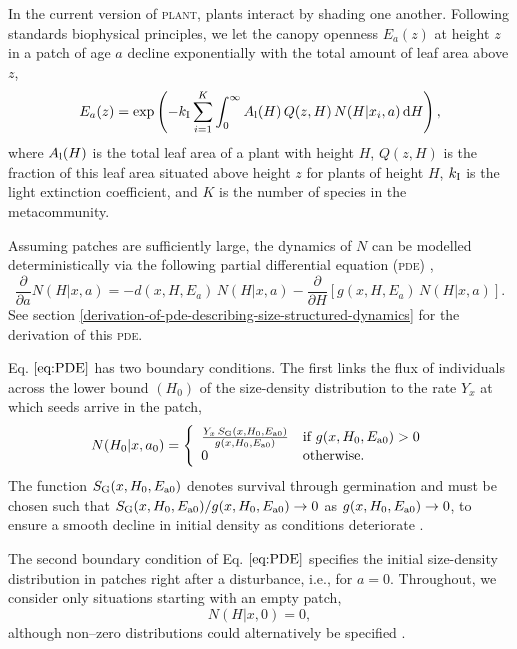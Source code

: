 \documentclass[10pt,twoside]{article}
\newcommand{\plant}{\textsc{plant}}
\begin{document}
In the current version of {\plant}, plants interact by shading one another.
Following standards biophysical principles, we let the canopy openness
\(E_a(z)\) at height \(z\) in a patch of age \(a\) decline exponentially
with the total amount of leaf area above \(z\),
\begin{equation} \label{eq:light}
E_a(z) = \exp \left(-k_{\rm I} \sum_{i = 1}^{K} \int_{0}^{\infty} A_{\rm l}(H) \, Q(z, H) \, N(H | x_i, a) \, {\rm d}H \right),
\end{equation}
where \(A_{\rm l}(H)\) is the total leaf area of a plant with height $H$, \(Q(z, H)\) is the fraction of
this leaf area situated above height \(z\) for plants of height \(H\),
\(k_{\rm I}\) is the light extinction coefficient, and \(K\) is the number
of species in the metacommunity.

Assuming patches are sufficiently large, the dynamics of \(N\) can be modelled
deterministically via the following partial differential equation (\textsc{pde})
\citep{Kohyama-1993, Deroos-1997, Moorcroft-2001},
\begin{equation} \label{eq:PDE}
\frac{\partial}{\partial a} N(H | x, a) = - d(x, H, E_a) \, N(H | x, a) - \frac{\partial}{\partial H} \left[g(x, H, E_a) \, N(H | x, a)\right].
\end{equation}
See section \ref{derivation-of-pde-describing-size-structured-dynamics} for the derivation of this \textsc{pde}.

Eq. \(\ref{eq:PDE}\) has two boundary conditions. The first links the
flux of individuals across the lower bound \((H_0)\) of the size-density
distribution to the rate \(Y_{x}\) at which seeds arrive in the patch,
\begin{equation} \label{eq:BC1}
N(H_0 | x, a_0) = \left\{
\begin{array}{ll} \frac{Y_{x} \, S_{\rm G} (x, H_0, E_{{\rm a}0}) }{ g(x, H_0, E_{{\rm a}0}) } & \textrm{if } g(x, H_0, E_{{\rm a}0}) > 0 \\
0 & \textrm{otherwise.}
\end{array} \right.
\end{equation}
The function \(S_{\rm G} (x, H_0, E_{{\rm a}0})\) denotes survival through
germination and must be chosen such that
\(S_{\rm G} (x, H_0, E_{{\rm a}0}) / g(x, H_0, E_{{\rm a}0}) \rightarrow 0\) as
\(g(x, H_0, E_{{\rm a}0}) \rightarrow 0\), to ensure a smooth decline in
initial density as conditions deteriorate \citep{Falster-2011}.

The second boundary condition of Eq. \(\ref{eq:PDE}\) specifies the initial size-density
distribution in patches right after a disturbance, i.e., for \(a = 0\). Throughout, we consider only
situations starting with an empty patch,
\begin{equation} \label{eq:BC2} N\left(H|x,0\right) = 0,
\end{equation}
although non--zero distributions could alternatively be specified
\citep[e.g.,][]{Kohyama-1993, Moorcroft-2001}.
\end{document}
